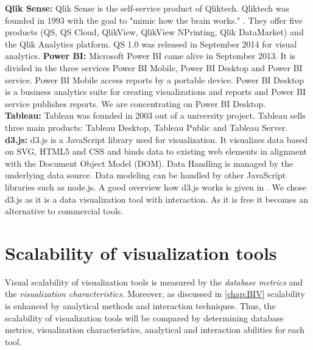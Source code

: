 \textbf{Qlik Sense: }
Qlik Sense is the self-service product of Qliktech. Qliktech was founded in 1993 with the goal to "mimic how the brain works."  \cite{qlikHistory}. They offer five products (QS, QS Cloud, QlikView, QlikView NPrinting, Qlik DataMarket) and the Qlik Analytics platform. QS 1.0 was released in September 2014 for visual analytics. 
\textbf{Power BI: }
Microsoft Power BI came alive in September 2013. It is divided in the three services Power BI Mobile, Power BI Desktop and Power BI service. Power BI Mobile access reports by a portable device. Power BI Desktop is a business analytics suite for creating visualizations and reports and Power BI service publishes reports. We are concentrating on Power BI Desktop.\\
\textbf{Tableau: }
Tableau was founded in 2003 out of a university project. Tableau sells three main products: Tableau Desktop, Tableau Public and Tableau Server.\\ 
\textbf{d3.js: }
d3.js is a JavaScript library used for visualization. It visualizes data based on SVG, HTML5 and CSS and binds data to existing web elements in alignment with the Document Object Model  (DOM).  Data Handling is managed by the underlying data source. Data modeling can be handled by other JavaScript libraries such as node.js. A good overview how d3.js works is given in  \cite{Meeks2015}. 
We chose d3.js as it is a data visualization tool with interaction. As it is free it becomes an alternative to commercial tools.\\


\section{Scalability of visualization tools}\label{tool:scalability}
Visual scalability of visualization tools is measured by the \textit{database metrics} and the \textit{visualization characteristics}. Moreover, as discussed in \ref{chap:BIV} scalability is enhanced by analytical methods and interaction techniques. Thus, the scalability of visualization tools will be compared by determining database metrics, visualization characteristics, analytical and interaction abilities for each tool.

